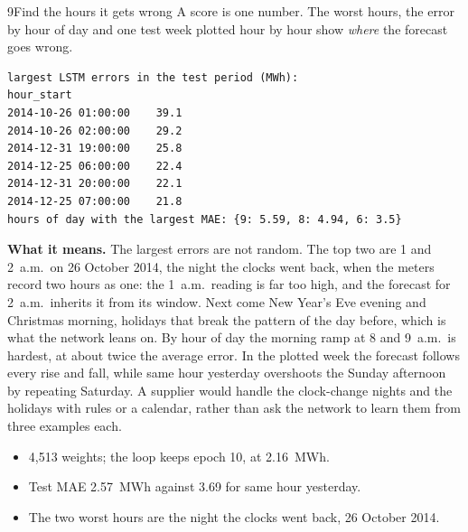 \begin{labquestion}{9}{Find the hours it gets wrong}
A score is one number. The worst hours, the error by hour of day and one test week plotted hour by hour show \emph{where} the forecast goes wrong.
\end{labquestion}
\begin{labanswer}

\begin{refoutput}
\begin{lstlisting}[style=utpterminal]
largest LSTM errors in the test period (MWh):
hour_start
2014-10-26 01:00:00    39.1
2014-10-26 02:00:00    29.2
2014-12-31 19:00:00    25.8
2014-12-25 06:00:00    22.4
2014-12-31 20:00:00    22.1
2014-12-25 07:00:00    21.8
hours of day with the largest MAE: {9: 5.59, 8: 4.94, 6: 3.5}
\end{lstlisting}
\end{refoutput}

\textbf{What it means.} The largest errors are not random. The top two are 1 and 2~a.m.\ on 26 October 2014, the night the clocks went back, when the meters record two hours as one: the 1~a.m.\ reading is far too high, and the forecast for 2~a.m.\ inherits it from its window. Next come New Year's Eve evening and Christmas morning, holidays that break the pattern of the day before, which is what the network leans on. By hour of day the morning ramp at 8 and 9~a.m.\ is hardest, at about twice the average error. In the plotted week the forecast follows every rise and fall, while same hour yesterday overshoots the Sunday afternoon by repeating Saturday. A supplier would handle the clock-change nights and the holidays with rules or a calendar, rather than ask the network to learn them from three examples each.
\end{labanswer}

\begin{labcheckpoint}
\begin{itemize}[leftmargin=1.2em,itemsep=2pt,topsep=1pt]
  \item 4,513 weights; the loop keeps epoch 10, at 2.16~MWh.
  \item Test MAE 2.57~MWh against 3.69 for same hour yesterday.
  \item The two worst hours are the night the clocks went back, 26 October 2014.
\end{itemize}
\end{labcheckpoint}


